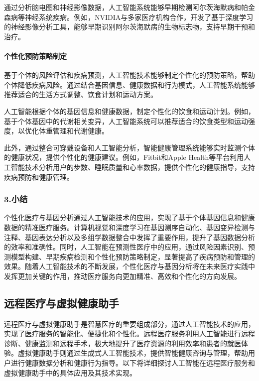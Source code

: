 通过分析脑电图和神经影像数据，人工智能系统能够早期检测阿尔茨海默病和帕金森病等神经系统疾病。例如，NVIDIA与多家医疗机构合作，开发了基于深度学习的神经影像分析工具，能够早期识别阿尔茨海默病的生物标志物，支持早期干预和治疗。

\paragraph{个性化预防策略制定}

基于个体的风险评估和疾病预测，人工智能技术能够制定个性化的预防策略，帮助个体降低疾病风险。通过结合基因信息、健康数据和行为模式，人工智能系统能够推荐适合的生活方式调整、饮食计划和运动方案。

人工智能根据个体的基因信息和健康数据，制定个性化的饮食和运动计划。例如，基于个体基因中的代谢相关变异，人工智能系统可以推荐适合的饮食类型和运动强度，以优化体重管理和代谢健康。

此外，通过整合可穿戴设备和人工智能分析，智能健康管理系统能够实时监测个体的健康状况，提供个性化的健康建议。例如，Fitbit和Apple Health等平台利用人工智能技术分析用户的步数、睡眠质量和心率数据，提供个性化的健康指导，支持疾病预防和健康管理。

\subsubsection{3.小结}

个性化医疗与基因分析通过人工智能技术的应用，实现了基于个体基因信息和健康数据的精准医疗服务。计算机视觉和深度学习在基因测序自动化、基因变异检测与注释、基因表达分析以及多组学数据整合中发挥了重要作用，提升了基因数据分析的效率和准确性。同时，人工智能在预测性医疗中的应用，通过风险因素识别、预测模型构建、早期疾病检测和个性化预防策略制定，显著提高了疾病预防和管理的效果。随着人工智能技术的不断发展，个性化医疗与基因分析将在未来医疗实践中发挥更加关键的作用，推动医疗服务向更加精准、高效和个性化的方向发展。

\subsection{远程医疗与虚拟健康助手}

远程医疗与虚拟健康助手是智慧医疗的重要组成部分，通过人工智能技术的应用，实现了医疗服务的智能化、便捷化和个性化。远程医疗服务利用人工智能进行远程诊断、健康监测和远程手术，极大地提升了医疗资源的利用效率和患者的就医体验。虚拟健康助手则通过生成式人工智能技术，提供智能健康咨询与管理，帮助用户进行健康数据分析和健康行为指导。以下将详细探讨人工智能在远程医疗服务和虚拟健康助手中的具体应用及其技术实现。

